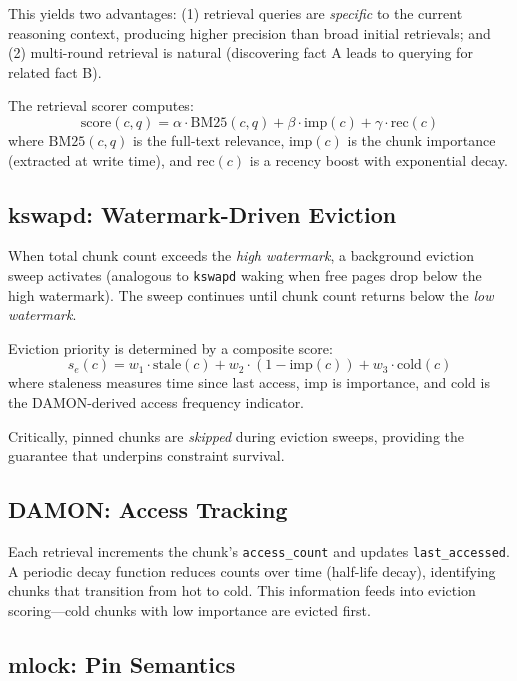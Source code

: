 \documentclass[10pt,twocolumn]{article}
\begin{document}
This yields two advantages: (1) retrieval queries are \emph{specific} to the current reasoning context, producing higher precision than broad initial retrievals; and (2) multi-round retrieval is natural (discovering fact A leads to querying for related fact B).

The retrieval scorer computes:
\begin{equation}
  \text{score}(c, q) = \alpha \cdot \text{BM25}(c, q) + \beta \cdot \text{imp}(c) + \gamma \cdot \text{rec}(c)
\end{equation}
where $\text{BM25}(c, q)$ is the full-text relevance, $\text{imp}(c)$ is the chunk importance (extracted at write time), and $\text{rec}(c)$ is a recency boost with exponential decay.

\subsection{kswapd: Watermark-Driven Eviction}

When total chunk count exceeds the \emph{high watermark}, a background eviction sweep activates (analogous to \texttt{kswapd} waking when free pages drop below the high watermark). The sweep continues until chunk count returns below the \emph{low watermark}.

Eviction priority is determined by a composite score:
\begin{equation}
  s_e(c) = w_1 \!\cdot\! \text{stale}(c) + w_2 \!\cdot\! (1{-}\text{imp}(c)) + w_3 \!\cdot\! \text{cold}(c)
\end{equation}
where $\text{staleness}$ measures time since last access, $\text{imp}$ is importance, and $\text{cold}$ is the DAMON-derived access frequency indicator.

Critically, pinned chunks are \emph{skipped} during eviction sweeps, providing the guarantee that underpins constraint survival.

\subsection{DAMON: Access Tracking}

Each retrieval increments the chunk's \texttt{access\_count} and updates \texttt{last\_accessed}. A periodic decay function reduces counts over time (half-life decay), identifying chunks that transition from hot to cold. This information feeds into eviction scoring---cold chunks with low importance are evicted first.

\subsection{mlock: Pin Semantics}
\end{document}
